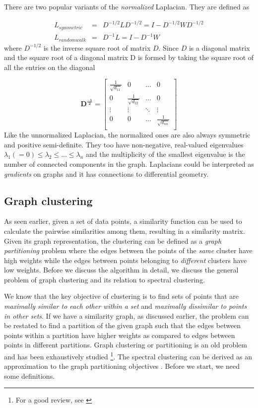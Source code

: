 There are two popular variants of the \textit{normalized} Laplacian. They are defined as

\begin{eqnarray}
	L_{symmetric} &=& D^{-1/2} L D^{-1/2} = I - D^{-1/2} W D^{-1/2} \label{eqn-lap_sym}\\
	L_{random walk} &=& D^{-1}L = I - D^{-1}W 
\end{eqnarray}
where $D^{-1/2}$ is the inverse square root of matrix $D$. Since $D$ is a diagonal matrix and the square root of a diagonal matrix D is formed by taking the square root of all the entries on the diagonal

\begin{displaymath}
    \mathbf{D^{\frac{-1}{2}}} = \begin{bmatrix} \frac{1}{\sqrt{d_{11}}} & 0 & \dots & 0\\
				 0 & \frac{1}{\sqrt{d_{22}}} & \dots & 0\\
                                 \vdots & \vdots & \ddots & \vdots\\
				 0 & 0 & \dots & \frac{1}{\sqrt{d_{nn}}}\\
                 \end{bmatrix}
\end{displaymath}
Like the unnormalized Laplacian, the normalized ones are also always symmetric and positive semi-definite. They too have non-negative, real-valued eigenvalues $\lambda_{1}(=0) \leq \lambda_{2}\leq \dots \leq \lambda_{n}$ and the multiplicity of the smallest eigenvalue is the number of connected components in the graph. Laplacians could be interpreted as \textit{gradients} on graphs and it has connections to differential geometry. 
\subsection{Graph clustering}
As seen earlier, given a set of data points, a similarity function can be used to calculate the pairwise similarities among them, resulting in a similarity matrix. Given its graph representation, the clustering can be defined as a \textit{graph partitioning} problem where the edges between the points of the \textit{same} cluster have high weights while the edges between points belonging to \textit{different} clusters have low weights. Before we discuss the algorithm in detail, we discuss the general problem of graph clustering and its relation to spectral clustering. 

We know that the key objective of clustering is to find sets of points that are \textit{maximally similar to each other within a set} and \textit{maximally dissimilar to points in other sets}. If we have a similarity graph, as discussed earlier, the problem can be restated to find a partition of the given graph such that the edges between points within a partition have higher weights as compared to edges between points in different partitions. Graph clustering or partitioning is an old problem and has been exhaustively studied \footnote{For a good review, see \cite{schaeffer1997graphclustering}}. The spectral clustering can be derived as an approximation to the graph partitioning objectives \citep{luxberg2006tutorial_spectral}. Before we start, we need some definitions.


